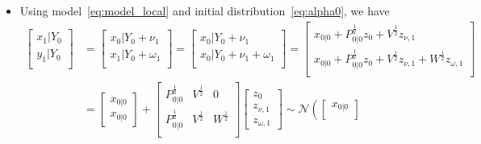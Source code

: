 \documentclass[12pt,a4paper]{article}
\begin{document}
\begin{itemize}
\begin{itemize}
    \begin{itemize}

    \item Using model~\eqref{eq:model_local} and initial
      distribution~\eqref{eq:alpha0}, we have
      \begin{align}
        \begin{bmatrix}
          x_{1}|Y_{0}\\
          y_{1}|Y_{0}\\
        \end{bmatrix}
        & =
          \begin{bmatrix}
            x_{0}|Y_{0} + \nu_{1}\\
            x_{1}|Y_{0} + \omega_{1}\\
          \end{bmatrix}
          =
          \begin{bmatrix}
            x_{0}|Y_{0} + \nu_{1}\\
            x_{0}|Y_{0} + \nu_{1} + \omega_{1}\\
          \end{bmatrix}
          =
          \begin{bmatrix}
            x_{0|0} + P_{0|0}^{\frac{1}{2}}z_{0} + V^{\frac{1}{2}}z_{\nu,1}\\
            x_{0|0} + P_{0|0}^{\frac{1}{2}}z_{0} + V^{\frac{1}{2}}z_{\nu,1} + W^{\frac{1}{2}}z_{\omega,1}\\
          \end{bmatrix}
          \nonumber \\
        & =
          \begin{bmatrix}
            x_{0|0}\\
            x_{0|0}
          \end{bmatrix}
          +
          \begin{bmatrix}
            P_{0|0}^{\frac{1}{2}} & V^{\frac{1}{2}} & 0\\
            P_{0|0}^{\frac{1}{2}} & V^{\frac{1}{2}} & W^{\frac{1}{2}}\\
          \end{bmatrix}
          \begin{bmatrix}
            z_{0}\\
            z_{\nu,1}\\
            z_{\omega,1}
          \end{bmatrix}
          \sim
          \mathcal{N} \left(
          \begin{bmatrix}
            x_{0|0}\\

\end{bmatrix}
\end{align}
\end{itemize}
\end{itemize}
\end{itemize}
\end{document}
